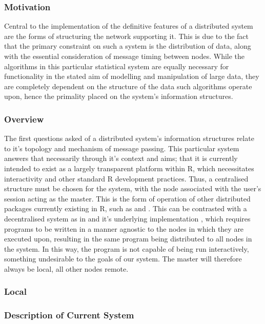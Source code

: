 \subsubsection{Motivation}\label{motivation}

Central to the implementation of the definitive features of a
distributed system are the forms of structuring the network supporting it.
This is due to the fact that the primary constraint on such a system is
the distribution of data, along with the essential consideration of
message timing between nodes. While the algorithms in this particular
statistical system are equally necessary for functionality in the stated
aim of modelling and manipulation of large data, they are completely
dependent on the structure of the data such algorithms operate upon,
hence the primality placed on the system's information structures.

\subsubsection{Overview}\label{overview}

The first questions asked of a distributed system's information
structures relate to it's topology and mechanism of message passing.
This particular system answers that necessarily through it's context and
aims; that it is currently intended to exist as a largely transparent
platform within R, which necessitates interactivity and other standard R
development practices. Thus, a centralised structure must be chosen for
the system, with the node associated with the user's \R{} session acting as
the master. This is the form of operation of other distributed packages
currently existing in R, such as  and 
\cites{luraschi20,tierney18}. This can be contrasted with a
decentralised system as in  and it's underlying
 implementation \cite{pbdR2012}, which requires \R{} programs
to be written in a manner agnostic to the nodes in which they are
executed upon, resulting in the same program being distributed to all
nodes in the system. In this way, the program is not capable of being
run interactively, something undesirable to the goals of our system. The
master will therefore always be local, all other nodes remote.

\subsubsection{Local}\label{local}

\subsubsection{Description of Current System}\label{description-of-current-system}

